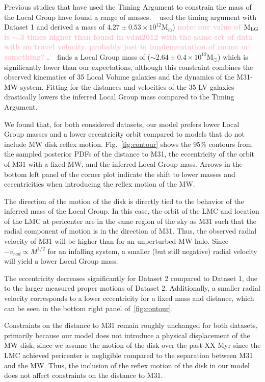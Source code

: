\documentclass[twocolumn]{aastex631}
\newcommand{\kc}[1]{\textcolor{pink}{\textbf{#1}} }
\newcommand{\mlg}{\ensuremath{\textrm{M}_{\rm LG}}}
\newcommand{\msun}{\ensuremath{\textrm{M}_{\odot}}}
\begin{document}
Previous studies that have used the Timing Argument to constrain the mass of the Local Group have found a range of masses. ~\cite{vdm2012} used the timing argument with Dataset 1 and derived a mass of $4.27\pm 0.53\times 10^{12}\msun$) \kc{note: our value of \mlg is $\sim$.3 times higher than found in vdm2012 with the same set of data with no travel velocity. probably just in implementation of mcmc or something?}.
~\cite{Penarrubia2016} finds a Local Group mass of ($\sim2.64\pm0.4\times 10^{12}\msun$) which is significantly lower than our expectations, although this constraint combines the observed kinematics of 35 Local Volume galaxies and the dynamics of the M31-MW system. Fitting for the distances and velocities of the 35 LV galaxies drastically lowers the inferred Local Group mass compared to the Timing Argument.


We found that, for both considered datasets, our model prefers lower Local Group masses and a lower eccentricity orbit compared to models that do not include MW disk reflex motion. Fig.~\ref{fig:contour} shows the 95\% contours from the sampled posterior PDFs of the distance to M31, the eccentricity of the orbit of M31 with a fixed MW, and the inferred Local Group mass. Arrows in the bottom left panel of the corner plot indicate the shift to lower masses and eccentricities when introducing the reflex motion of the MW.

The direction of the motion of the disk is directly tied to the behavior of the inferred mass of the Local Group. In this case, the orbit of the LMC and location of the LMC at pericenter are in the same region of the sky as M31 such that the radial component of motion is in the direction of M31. Thus, the observed radial velocity of M31 will be higher than for an unperturbed MW halo. Since $-v_{rad}\propto M^{1/2}$ for an infalling system, a smaller (but still negative) radial velocity will yield a lower Local Group mass.

The eccentricity decreases significantly for Dataset 2 compared to Dataset 1, due to the larger measured proper motions of Dataset 2.  Additionally, a smaller radial velocity corresponds to a lower eccentricity for a fixed mass and distance, which can be seen in the bottom right panel of~\ref{fig:contour}.

Constraints on the distance to M31 remain roughly unchanged for both datasets, primarily because our model does not introduce a physical displacement of the MW disk, since we assume the motion of the disk over the past XX Myr since the LMC achieved pericenter is negligible compared to the separation between M31 and the MW. Thus, the inclusion of the reflex motion of the disk in our model does not affect constraints on the distance to M31.
\end{document}
